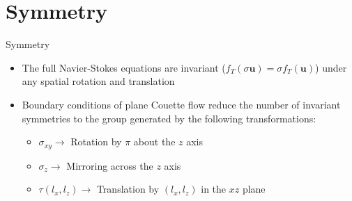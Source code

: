 \documentclass[10pt]{beamer}
\newcommand{\Vector}[1]{\mathbf{#1}}
\begin{document}
\section{Symmetry}

\begin{frame}{Symmetry}
\begin{itemize}
\item<1-> The full Navier-Stokes equations are invariant ($f_T(\sigma\Vector{u}) = \sigma f_T(\Vector{u})$) under any spatial rotation and translation
\item<2-> Boundary conditions of plane Couette flow reduce the number of invariant symmetries to the group generated by the following transformations:
\begin{itemize}
\item<3-> $\sigma_{xy} \rightarrow$ Rotation by $\pi$ about the $z$ axis
\item<4-> $\sigma_{z} \rightarrow $ Mirroring across the $z$ axis
\item<5-> $\tau(l_x,l_z) \rightarrow $ Translation by $(l_x,l_z)$ in the $xz$ plane
\end{itemize}
\end{itemize}
\end{frame}
\end{document}
